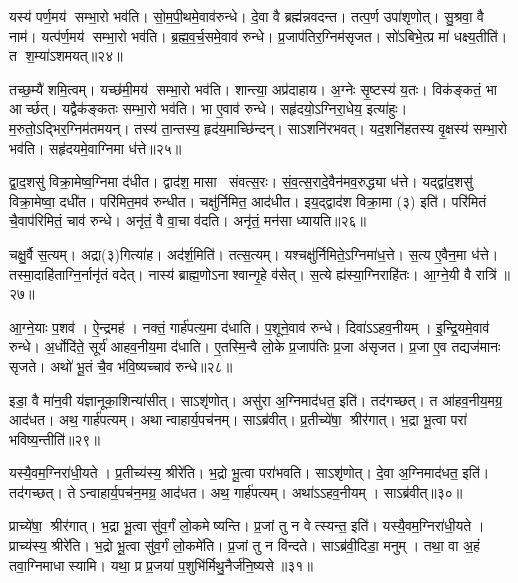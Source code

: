 यस्य॑ पर्ण॒मय॑ सम्भा॒रो भव॑ति।
सो॒म॒पी॒थमे॒वाव॑रुन्धे।
दे॒वा वै ब्रह्म॑न्नवदन्त।
तत्प॒र्ण उपा॑शृणोत्।
सु॒श्रवा॒ वै नाम॑।
यत्प॑र्ण॒मय॑ सम्भा॒रो भव॑ति।
ब्र॒ह्म॒व॒र्च॒समे॒वाव॑ रुन्धे।
प्र॒जाप॑तिर॒ग्निम॑सृजत।
सो॑ऽबिभे॒त्प्र मा॑ धक्ष्य॒तीति॑।
त श॒म्या॑ऽशमयत्॥२४॥

तच्छ॒म्यै॑ शमि॒त्वम्।
यच्छ॑मी॒मय॑ सम्भा॒रो भव॑ति।
शान्त्या॒ अप्र॑दाहाय।
अ॒ग्नेः सृ॒ष्टस्य॑ य॒तः।
विक॑ङ्कतं॒ भा आर्च्छत्।
यद्वैक॑ङ्कतः सम्भा॒रो भव॑ति।
भा ए॒वाव॑ रुन्धे।
सहृ॑दयो॒ऽग्निरा॒धेय॒ इत्या॑हुः।
म॒रुतो॒ऽद्भिर॒ग्निम॑तमयन्।
तस्य॑ ता॒न्तस्य॒ हृद॑य॒माच्छि॑न्दन्।
साऽशनि॑रभवत्।
यद॒शनि॑हतस्य वृ॒क्षस्य॑ सम्भा॒रो भव॑ति।
सहृ॑दयमे॒वाग्निमा ध॑त्ते॥२५॥

द्वा॒द॒शसु॑ विक्रा॒मेष्व॒ग्निमा द॑धीत।
द्वाद॑श॒ मासा संवत्स॒रः।
सं॒व॒त्स॒रादे॒वैन॑मव॒रुद्ध्या ध॑त्ते।
यद्द्वा॑द॒शसु॑ विक्रा॒मेष्वा॒ दधी॑त।
परि॑मित॒मव॑ रुन्धीत।
चक्षु॑र्निमित॒ आद॑धीत।
इय॒द्द्वाद॑श विक्रा॒मा (३) इति॑।
परि॑मितं चै॒वाप॑रिमितं॒ चाव॑ रुन्धे।
अनृ॑तं॒ वै वा॒चा व॑दति।
अनृ॑तं॒ मन॑सा ध्यायति॥२६॥

चक्षु॒र्वै स॒त्यम्।
अद्रा(३)गित्या॑ह।
अद॑र्\mbox{}श॒मिति॑।
तत्स॒त्यम्।
यश्चक्षु॑र्निमिते॒ऽग्निमा॑ध॒त्ते।
स॒त्य ए॒वैन॒मा ध॑त्ते।
तस्मा॒दाहि॑ताग्नि॒र्नानृ॑तं वदेत्।
नास्य॑ ब्राह्म॒णोऽनाश्वान्गृ॒हे व॑सेत्।
स॒त्ये ह्य॑स्या॒ग्निराहि॑तः।
आ॒ग्ने॒यी वै रात्रि॑॥२७॥

आ॒ग्ने॒याः प॒शव॑।
ऐ॒न्द्रमह॑।
नक्तं॒ गार्\mbox{}ह॑पत्य॒मा द॑धाति।
प॒शूने॒वाव॑ रुन्धे।
दिवा॑ऽऽहव॒नीयम्।
इ॒न्द्रि॒यमे॒वाव॑ रुन्धे।
अ॒र्धोदि॑ते॒ सूर्य॑ आहव॒नीय॒मा द॑धाति।
ए॒तस्मि॒न्वै लो॒के प्र॒जाप॑तिः प्र॒जा अ॑सृजत।
प्र॒जा ए॒व तद्यज॑मानः सृजते।
अथो॑ भू॒तं चै॒व भ॑वि॒ष्यच्चाव॑ रुन्धे॥२८॥

इडा॒ वै मा॑न॒वी य॑ज्ञानूका॒शिन्या॑सीत्।
साऽशृ॑णोत्।
असु॑रा अ॒ग्निमाद॑धत॒ इति॑।
तद॑गच्छत्।
त आ॑हव॒नीय॒मग्र॒ आद॑धत।
अथ॒ गार्\mbox{}ह॑पत्यम्।
अथान्वाहार्य॒पच॑नम्।
साऽब्र॑वीत्।
प्र॒तीच्ये॑षा॒ श्रीर॑गात्।
भ॒द्रा भू॒त्वा परा॑ भविष्य॒न्तीति॑॥२९॥

यस्यै॒वम॒ग्निरा॑धी॒यते।
प्र॒तीच्य॑स्य॒ श्रीरे॑ति।
भ॒द्रो भू॒त्वा परा॑भवति।
साऽशृ॑णोत्।
दे॒वा अ॒ग्निमाद॑धत॒ इति॑।
तद॑गच्छत्।
तेऽन्वाहार्य॒पच॑न॒मग्र॒ आद॑धत।
अथ॒ गार्\mbox{}ह॑पत्यम्।
अथा॑ऽऽहव॒नीयम्।
साऽब्र॑वीत्॥३०॥

प्राच्ये॑षा॒ श्रीर॑गात्।
भ॒द्रा भू॒त्वा सु॑व॒र्गं लो॒कमेष्यन्ति।
प्र॒जां तु न वेत्स्यन्त॒ इति॑।
यस्यै॒वम॒ग्निरा॑धी॒यते।
प्राच्य॑स्य॒ श्रीरे॑ति।
भ॒द्रो भू॒त्वा सु॑व॒र्गं लो॒कमे॑ति।
प्र॒जां तु न वि॑न्दते।
साऽब्र॑वी॒दिडा॒ मनुम्।
तथा॒ वा अ॒हं तवा॒ग्निमाधास्यामि।
यथा॒ प्र प्र॒जया॑ प॒शुभि॑र्मिथु॒नैर्ज॑नि॒ष्यसे॥३१॥

